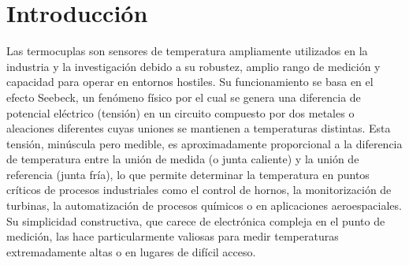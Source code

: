 \section*{Introducción}

Las termocuplas son sensores de temperatura ampliamente utilizados en la industria y la investigación debido a su robustez, amplio rango de medición y capacidad para operar en entornos hostiles. Su funcionamiento se basa en el efecto Seebeck, un fenómeno físico por el cual se genera una diferencia de potencial eléctrico (tensión) en un circuito compuesto por dos metales o aleaciones diferentes cuyas uniones se mantienen a temperaturas distintas. Esta tensión, minúscula pero medible, es aproximadamente proporcional a la diferencia de temperatura entre la unión de medida (o junta caliente) y la unión de referencia (junta fría), lo que permite determinar la temperatura en puntos críticos de procesos industriales como el control de hornos, la monitorización de turbinas, la automatización de procesos químicos o en aplicaciones aeroespaciales. Su simplicidad constructiva, que carece de electrónica compleja en el punto de medición, las hace particularmente valiosas para medir temperaturas extremadamente altas o en lugares de difícil acceso.

